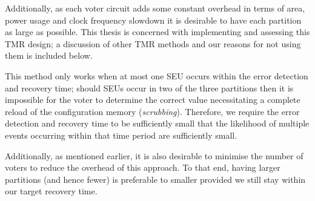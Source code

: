 \documentclass[12pt,final,oneside]{dwThesis} %
\begin{document}
Additionally, as each voter circuit adds some constant overhead in terms of area, power usage and clock frequency slowdown it is desirable to have each partition as large as possible. This thesis is concerned with implementing and assessing this \ac{TMR} design; a discussion of other \ac{TMR} methods and our reasons for not using them is included below.
 
This method only works when at most one \ac{SEU} occurs within the error detection and recovery time; should \acp{SEU} occur in two of the three partitions then it is impossible for the voter to determine the correct value necessitating a complete reload of the configuration memory (\emph{scrubbing}). Therefore, we require the error detection and recovery time to be sufficiently small that the likelihood of multiple events occurring within that time period are sufficiently small.

Additionally, as mentioned earlier, it is also desirable to minimise the number of voters to reduce the overhead of this approach. To that end, having larger partitions (and hence fewer) is preferable to smaller provided we still stay within our target recovery time.
\end{document}

